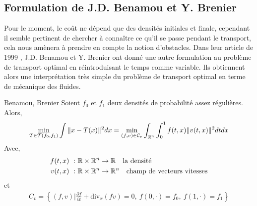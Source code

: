\documentclass[a4paper,12pt]{article}
\begin{document}
\subsection{Formulation de J.D. Benamou et Y. Brenier}
Pour le moment, le coût ne dépend que des densités initiales et finale, cependant il semble pertinent de chercher à connaître ce qu'il se passe pendant le transport, cela nous amènera à prendre en compte la notion d'obstacles. 
Dans leur article de 1999 \cite{benamoubrenier}, J.D. Benamou et Y. Brenier ont donné une autre formulation au problème de transport optimal en réintroduisant le temps comme variable. Ils obtiennent alors une interprétation très simple du problème de transport optimal en terme de mécanique des fluides. 

\begin{theoreme}{Benamou, Brenier}
Soient $f_0$ et $f_1$ deux densités de probabilité assez régulières. Alors, 
\begin{align}
\min_{T\in\mathcal{T}(f_0,f_1)} \int\|x-T(x)\|^2dx =\min_{(f,v)\in\mathcal{C}_v}\int_{\mathbb{R}^n}\int_0^1 f(t,x)\|v(t,x)\|^2dtdx
\end{align}
Avec,
\begin{align*}
f(t,x)\ :&\ \mathbb{R}\times\mathbb{R}^n\rightarrow \mathbb{R} \quad \text{la densité}\\
v(t,x)\ :&\ \mathbb{R}\times\mathbb{R}^n\rightarrow \mathbb{R}^n \quad \text{champ de vecteurs vitesses}
\end{align*}
et 
\begin{align}
C_v=\left\{(f,v) | \frac{\partial f}{\partial t} + \text{div}_x (fv) =0,\ f(0,\cdot) = f_0,\ f(1,\cdot)=f_1 \right\}
\label{eq:contraintes}
\end{align}
\end{theoreme}
\end{document}
